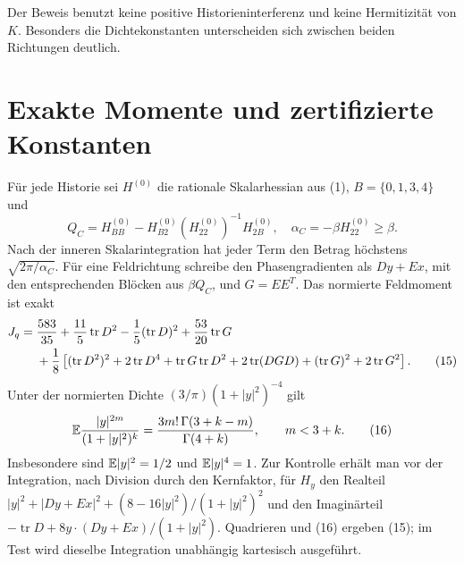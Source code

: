\documentclass[10pt,a4paper]{article}
\begin{document}
Der Beweis benutzt keine positive Historieninterferenz und keine
Hermitizität von $K$. Besonders die Dichtekonstanten unterscheiden sich
zwischen beiden Richtungen deutlich.
\newpage

\section{Exakte Momente und zertifizierte Konstanten}
Für jede Historie sei $H^{(0)}$ die rationale Skalarhessian aus (1),
$B=\{0,1,3,4\}$ und
\[
 Q_C=H^{(0)}_{BB}-H^{(0)}_{B2}(H^{(0)}_{22})^{-1}H^{(0)}_{2B},
 \quad \alpha_C=-\beta H^{(0)}_{22}\ge\beta.
\]
Nach der inneren Skalarintegration hat jeder Term den Betrag höchstens
$\sqrt{2\pi/\alpha_C}$. Für eine Feldrichtung schreibe den Phasengradienten
als $Dy+Ex$, mit den entsprechenden Blöcken aus $\beta Q_C$, und $G=EE^T$.
Das normierte Feldmoment ist exakt
\begin{align}
 J_q={}&\frac{583}{35}+\frac{11}{5}\operatorname{tr}D^2
 -\frac15(\operatorname{tr}D)^2+\frac{53}{20}\operatorname{tr}G\notag\\
 &+\frac18\left[(\operatorname{tr}D^2)^2+2\operatorname{tr}D^4
 +\operatorname{tr}G\operatorname{tr}D^2+2\operatorname{tr}(DGD)
 +(\operatorname{tr}G)^2+2\operatorname{tr}G^2\right].       \tag{15}
\end{align}
Unter der normierten Dichte $(3/\pi)(1+|y|^2)^{-4}$ gilt
\[
 \mathbb E\frac{|y|^{2m}}{(1+|y|^2)^k}
 =\frac{3m!\,\Gamma(3+k-m)}{\Gamma(4+k)},\qquad m<3+k.    \tag{16}
\]
Insbesondere sind $\mathbb E|y|^2=1/2$ und $\mathbb E|y|^4=1$.
Zur Kontrolle erhält man vor der Integration, nach Division durch den
Kernfaktor, für $H_y$ den Realteil
$|y|^2+|Dy+Ex|^2+(8-16|y|^2)/(1+|y|^2)^2$ und den Imaginärteil
$-\operatorname{tr}D+8y\cdot(Dy+Ex)/(1+|y|^2)$. Quadrieren und (16)
ergeben (15); im Test wird dieselbe Integration unabhängig kartesisch ausgeführt.
\end{document}
